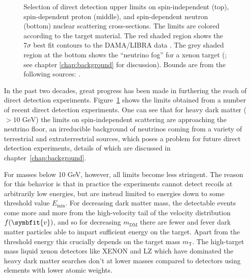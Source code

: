 \documentclass[b5paper, 10pt, twoside]{book}
\renewcommand{\vec}[1]{\symbfit{#1}}
\begin{document}
\begin{figure}
\vspace*{-1.0pc}
\caption{Selection of direct detection upper limits on spin-independent (top), spin-dependent proton (middle), and spin-dependent neutron (bottom) nuclear scattering cross-sections. The limits are colored according to the target material. The red shaded region shows the $7\sigma$ best fit contours to the DAMA/LIBRA data \parencite{SavageEtAl2009}. The grey shaded region at the bottom shows the ``neutrino fog'' for a xenon target (\textcite{OHare2021}; see chapter \ref{chap:background} for discussion). Bounds are from the following sources: \textcites{DarkSide2023, XENONnT2023, CDEX2019, PandaX2021, DAMIC2020, LZ2024, CRESSTIII2019, COSINE1002018, CDMSlite2018, PICO602019, XENON2019a}.}
\label{fig:dd-reach}
\end{figure}

In the past two decades, great progress has been made in furthering the reach of direct detection experiments. Figure~\ref{fig:dd-reach} shows the limits obtained from a number of recent direct detection experiments. One can see that for heavy dark matter ($> 10\text{ GeV}$) the limits on spin-independent scattering are approaching the neutrino floor, an irreducible background of neutrinos coming from a variety of terrestrial and extraterrestrial sources, which poses a problem for future direct detection experiments, details of which are discussed in chapter~\ref{chap:background}.

For masses below 10 GeV, however, all limits become less stringent. The reason for this behavior is that in practice the experiments cannot detect recoils at arbitrarily low energies, but are instead limited to energies down to some threshold value $E_\text{min}$. For decreasing dark matter mass, the detectable events come more and more from the high-velocity tail of the velocity distribution $f(\vec{v})$, and so for decreasing $m_\text{DM}$ there are fewer and fever dark matter particles able to impart sufficient energy on the target. Apart from the threshold energy this crucially depends on the target mass $m_\text{T}$. The high-target mass liquid xenon detectors like XENON and LZ which have dominated the heavy dark matter searches don't at lower masses compared to detectors using elements with lower atomic weights.

\end{document}

